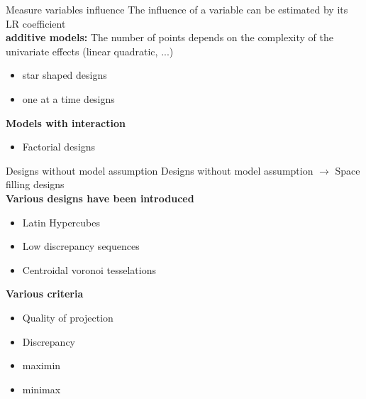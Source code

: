 \documentclass{beamer}
\begin{document}
\begin{frame}{Measure variables influence}
The influence of a variable can be estimated by its LR coefficient \\ \vspace{3mm}
\textbf{additive models:}
\vspace{1mm}
The number of points depends on the complexity of the univariate effects (linear quadratic, ...)
	\begin{itemize}
		\item star shaped designs
		\item one at a time designs
	\end{itemize}
\vspace{2mm}
\textbf{Models with interaction}
\vspace{1mm}
	\begin{itemize}
		\item Factorial designs
	\end{itemize}
\end{frame}


\begin{frame}{Designs without model assumption}
Designs without model assumption $\rightarrow$ Space filling designs\\ \vspace{3mm}
\textbf{Various designs have been introduced} \vspace{1mm}
	\begin{itemize}
		\item Latin Hypercubes
		\item Low discrepancy sequences
		\item Centroidal voronoi tesselations 
	\end{itemize}
\vspace{3mm}
\textbf{Various criteria} \vspace{1mm}
	\begin{itemize}
		\item Quality of projection
		\item Discrepancy
		\item maximin
		\item minimax
	\end{itemize}
\end{frame}
\end{document}
